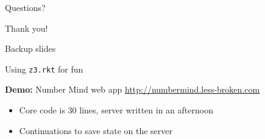 \documentclass{beamer}
\begin{document}
\begin{frame}{Questions?}
\begin{center}
Thank you!
\end{center}
\end{frame}

\begin{frame}
Backup slides
\end{frame}

\begin{frame}{Using \texttt{z3.rkt} for fun}
\begin{center}
\textbf{Demo:} Number Mind web app \url{http://numbermind.less-broken.com}
\end{center}
\pause
\begin{itemize}
\item Core code is 30 lines, server written in an afternoon
\item Continuations to save state on the server
\end{itemize}
\end{frame}
\end{document}
